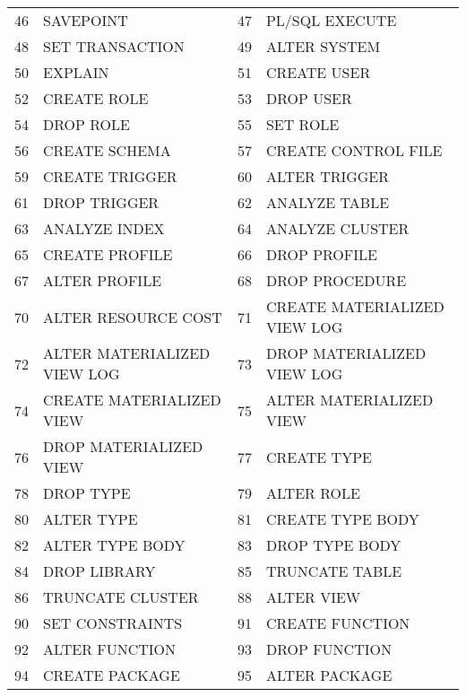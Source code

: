 \begin{appendix}
\begin{longtable}[]{@{}rl|rl@{}}
46  & SAVEPOINT                    & 47  & PL/SQL EXECUTE               \\
48  & SET TRANSACTION              & 49  & ALTER SYSTEM                 \\
50  & EXPLAIN                      & 51  & CREATE USER                  \\
52  & CREATE ROLE                  & 53  & DROP USER                    \\
54  & DROP ROLE                    & 55  & SET ROLE                     \\
56  & CREATE SCHEMA                & 57  & CREATE CONTROL FILE          \\
59  & CREATE TRIGGER               & 60  & ALTER TRIGGER                \\
61  & DROP TRIGGER                 & 62  & ANALYZE TABLE                \\
63  & ANALYZE INDEX                & 64  & ANALYZE CLUSTER              \\
65  & CREATE PROFILE               & 66  & DROP PROFILE                 \\
67  & ALTER PROFILE                & 68  & DROP PROCEDURE               \\
70  & ALTER RESOURCE COST          & 71  & CREATE MATERIALIZED VIEW LOG \\
72  & ALTER MATERIALIZED VIEW LOG  & 73  & DROP MATERIALIZED VIEW LOG   \\
74  & CREATE MATERIALIZED VIEW     & 75  & ALTER MATERIALIZED VIEW      \\
76  & DROP MATERIALIZED VIEW       & 77  & CREATE TYPE                  \\
78  & DROP TYPE                    & 79  & ALTER ROLE                   \\
80  & ALTER TYPE                   & 81  & CREATE TYPE BODY             \\
82  & ALTER TYPE BODY              & 83  & DROP TYPE BODY               \\
84  & DROP LIBRARY                 & 85  & TRUNCATE TABLE               \\
86  & TRUNCATE CLUSTER             & 88  & ALTER VIEW                   \\
90  & SET CONSTRAINTS              & 91  & CREATE FUNCTION              \\
92  & ALTER FUNCTION               & 93  & DROP FUNCTION                \\
94  & CREATE PACKAGE               & 95  & ALTER PACKAGE                \\

\end{longtable}
\end{appendix}
